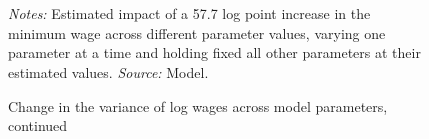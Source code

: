\begin{figure}[!htb]
  \centering
  \caption{Change in the variance of log wages across model parameters, continued\label{figure: robustness_appendix2}}
  \prefigvspace
  \hspace*{\fill}%
  \centerhfill[\qquad\qquad\qquad\qquad\qquad]
  \hspace*{\fill}
  \\
  \hspace*{\fill}%
  \centerhfill[\qquad\qquad\qquad\qquad\qquad]
  \hspace*{\fill}

  \hspace*{\fill}%
  \hspace*{\fill}
  \\
  \postfigvspace
  \begin{minipage}[t]{1\columnwidth}%
    \begin{spacing}{0.75}
      \emph{\scriptsize{}Notes: }{\scriptsize{}Estimated impact of a 57.7 log point increase in the minimum wage across different parameter values, varying one parameter at a time and holding fixed all other parameters at their estimated values.
      \emph{\scriptsize{}Source: } Model.}
    \end{spacing}
  \end{minipage}
\end{figure}
